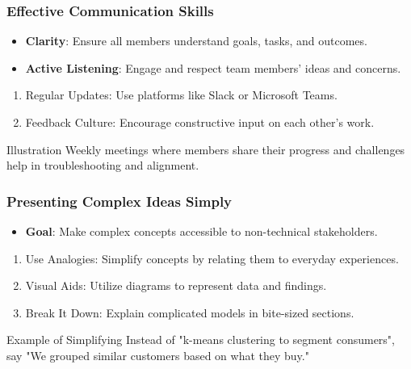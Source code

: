 \documentclass{beamer}
\begin{document}
\begin{frame}[fragile]
    \frametitle{Effective Communication Skills}
    \begin{itemize}
        \item \textbf{Clarity}: Ensure all members understand goals, tasks, and outcomes.
        \item \textbf{Active Listening}: Engage and respect team members' ideas and concerns.
    \end{itemize}

    \begin{enumerate}
        \item Regular Updates: Use platforms like Slack or Microsoft Teams.
        \item Feedback Culture: Encourage constructive input on each other's work.
    \end{enumerate}

    \begin{block}{Illustration}
        Weekly meetings where members share their progress and challenges help in troubleshooting and alignment.
    \end{block}
\end{frame}

\begin{frame}[fragile]
    \frametitle{Presenting Complex Ideas Simply}
    \begin{itemize}
        \item \textbf{Goal}: Make complex concepts accessible to non-technical stakeholders.
    \end{itemize}

    \begin{enumerate}
        \item Use Analogies: Simplify concepts by relating them to everyday experiences.
        \item Visual Aids: Utilize diagrams to represent data and findings.
        \item Break It Down: Explain complicated models in bite-sized sections.
    \end{enumerate}

    \begin{block}{Example of Simplifying}
        Instead of "k-means clustering to segment consumers", say "We grouped similar customers based on what they buy."
    \end{block}
\end{frame}
\end{document}
